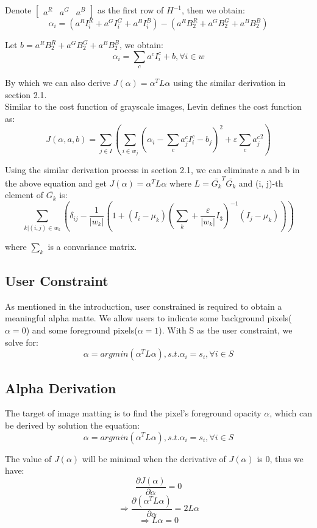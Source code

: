 \documentclass[11pt,letterpaper]{article}
\begin{document}
Denote $\begin{bmatrix} a^R & a^G & a^B \end{bmatrix}$ as the first row of $H^{-1}$, then we obtain: 
$$\alpha_i = 
(a^RI_i^R + a^GI_i^G + a^BI_i^B)-(a^RB_2^R + a^GB_2^G + a^BB_2^B)$$

Let $b = a^RB_2^R + a^GB_2^G + a^BB_2^B$, we obtain:
$$\alpha_i = \sum_{c}a^cI_i^c + b, \forall i \in w$$

By which we can also derive $J(\alpha) = \alpha^T L \alpha$ using the similar derivation in section 2.1. \\

Similar to the cost function of gray­scale images, Levin defines the cost function as:
$$J(\alpha, a, b) = \sum_{j \in I}(\sum_{i \in w_j}(\alpha_i - \sum_c a_j^c I_i^c-b_j)^2+\varepsilon \sum_{c}{a_j^c}^2)$$

Using the similar derivation process in section 2.1, we can eliminate a and b in the above equation and get $J(\alpha) = \alpha^T L \alpha$ where $L = \bar{G_k}^T \bar{G_k}$ and (i, j)-th element of $\bar{G_k}$ is:
$$\sum_{k|(i,j) \in w_k} (\delta_{ij} - \frac{1}{|w_k|}(1 + (I_i - \mu_k)(\sum_k + \frac{\varepsilon}{|w_k|}I_3)^{-1}(I_j - \mu_k)))$$

where $\sum_k$ is a convariance matrix.
\subsection{User Constraint}
As mentioned in the introduction, user constrained is required to obtain a meaningful alpha matte. We allow users to indicate some background pixels($\alpha = 0$) and some foreground pixels($\alpha = 1$). With S as the user constraint, we solve for:
$$\alpha = argmin(\alpha^T L \alpha), s.t.\alpha_i = s_i, \forall i \in S $$

\subsection{Alpha Derivation}
The target of image matting is to find the pixel’s foreground opacity $\alpha$, which can be derived by solution the equation:
$$\alpha = argmin(\alpha^T L \alpha), s.t.\alpha_i = s_i, \forall i \in S $$

The value of $J(\alpha)$ will be minimal when the derivative of $J(\alpha)$ is 0, thus we have:
$$\frac{\partial J(\alpha)}{\partial \alpha} = 0$$
$$\Rightarrow \frac{\partial{(\alpha^T L \alpha)}}{\partial \alpha} = 2L\alpha$$
$$\Rightarrow L\alpha = 0$$
\end{document}
